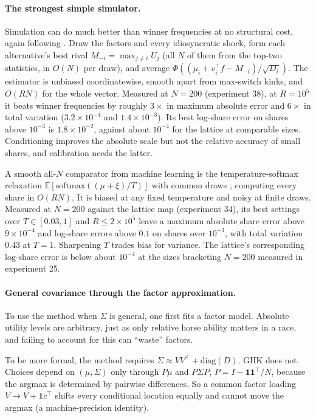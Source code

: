 \documentclass[12pt]{article}
\theoremstyle{remark}
\newcommand{\E}{\mathbb{E}}
\begin{document}
\paragraph{The strongest simple simulator.} Simulation can do much
better than winner frequencies at no structural cost, again following
\citet{train1995}. Draw the factors
and every idiosyncratic shock, form each alternative's best rival
$M_{-i} = \max_{j \ne i} U_j$ (all $N$ of them from the top-two
statistics, in $O(N)$ per draw), and average $\Phi((\mu_i + v_i^\top
f - M_{-i})/\sqrt{D_i})$. The estimator is unbiased coordinatewise,
smooth apart from max-switch kinks, and $O(RN)$ for the whole vector.
Measured at $N = 200$ (experiment 38), at $R = 10^5$ it beats winner
frequencies by roughly $3\times$ in maximum absolute error and
$6\times$ in total variation ($3.2\times10^{-4}$ and
$1.4\times10^{-3}$). Its best log-share error on shares above $10^{-3}$
is $1.8\times10^{-2}$, against about $10^{-4}$ for the lattice at
comparable sizes. Conditioning improves the absolute scale but not the relative accuracy
of small shares, and calibration needs the latter.

A smooth all-$N$ comparator from machine learning is the
temperature-softmax relaxation $\E[\mathrm{softmax}((\mu + \xi)/T)]$
with common draws \citep{collier2021,berthet2020}, computing every
share in $O(RN)$. It is biased at any fixed temperature and noisy at
finite draws. Measured at $N = 200$ against the lattice map (experiment
34), its best settings over $T \in [0.03, 1]$ and $R \le 2\times10^5$
leave a maximum absolute share error above $9\times10^{-4}$ and
log-share errors above $0.1$ on shares over $10^{-3}$, with total
variation $0.43$ at $T = 1$. Sharpening $T$ trades bias for variance.
The lattice's corresponding log-share error is below about $10^{-4}$
at the sizes bracketing $N = 200$ measured in experiment 25.

\paragraph{General covariance through the factor approximation.} 

To use the method when $\Sigma$ is general, one first fits a factor
model. Absolute utility levels are arbitrary, just as only relative
horse ability matters in a race, and failing to account for this can
``waste'' factors. 

To be more formal, the method
requires $\Sigma \approx VV^\top + \mathrm{diag}(D)$. GHK does not. Choices depend on
$(\mu, \Sigma)$ only through $P\mu$ and $P\Sigma P$, $P = I -
\mathbf{1}\mathbf{1}^\top/N$, because the argmax is determined by
pairwise differences. So a common factor loading $V \to V +
\mathbf{1}c^\top$ shifts every conditional location equally and cannot move
the argmax (a machine-precision identity). 
\end{document}
